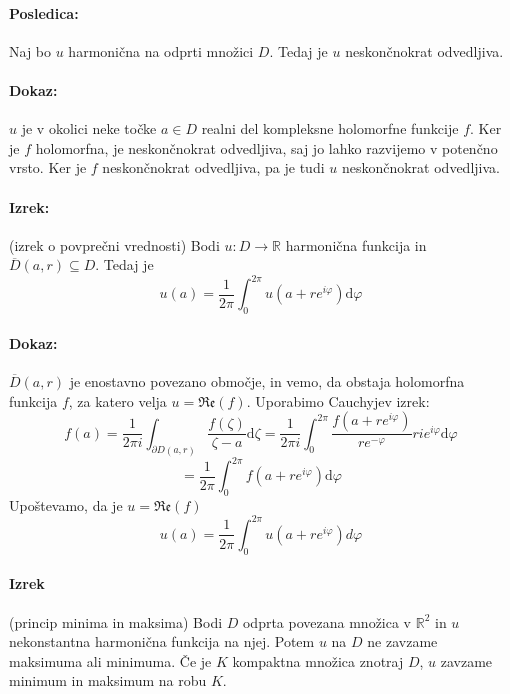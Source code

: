 \documentclass[a4paper]{article}
\newcommand{\dif}{\mathrm{d}}
\newcommand{\R}{\mathbb{R}}
\newcommand{\fn}[3]{{#1}\colon {#2} \rightarrow {#3}}
\begin{document}
\paragraph{Posledica:} Naj bo $u$ harmonična na odprti množici $D$. Tedaj je $u$ neskončnokrat odvedljiva.
\paragraph{Dokaz:} $u$ je v okolici neke točke $a \in D$ realni del kompleksne holomorfne funkcije $f$. Ker je $f$ holomorfna, je neskončnokrat odvedljiva, saj jo lahko razvijemo v potenčno vrsto.
Ker je $f$ neskončnokrat odvedljiva, pa je tudi $u$ neskončnokrat odvedljiva.
\paragraph{Izrek:} (izrek o povprečni vrednosti) Bodi $\fn{u}{D}{\R}$ harmonična funkcija in $\overline{D}(a, r) \subseteq D$. Tedaj je 
$$u(a) = \frac{1}{2\pi} \int_{0}^{2\pi} u(a + re^{i\varphi})\dif\varphi$$
\paragraph{Dokaz:} $\overline{D}(a, r)$ je enostavno povezano območje, in vemo, da obstaja holomorfna funkcija $f$, za katero velja $u = \mathfrak{Re}(f)$.
Uporabimo Cauchyjev izrek:
$$f(a) = \frac{1}{2 \pi i} \int_{\partial D(a, r)}\frac{f(\zeta)}{\zeta - a}\dif\zeta = \frac{1}{2\pi i} \int_{0}^{2\pi}\frac{f(a+re^{i\varphi})}{re^{-\varphi}} rie^{i\varphi}\dif\varphi$$
$$= \frac{1}{2\pi} \int_{0}^{2\pi} f(a + re^{i\varphi})\dif\varphi$$
Upoštevamo, da je $u = \mathfrak{Re}(f)$
$$u(a) = \frac{1}{2\pi}\int_{0}^{2\pi} u(a + re^{i\varphi}) d\varphi$$
\paragraph{Izrek} (princip minima in maksima) Bodi $D$ odprta povezana množica v $\R^2$ in $u$ nekonstantna harmonična funkcija na njej.
Potem $u$ na $D$ ne zavzame maksimuma ali minimuma. Če je $K$ kompaktna množica znotraj $D$, $u$ zavzame minimum in maksimum na robu $K$.
\end{document}
